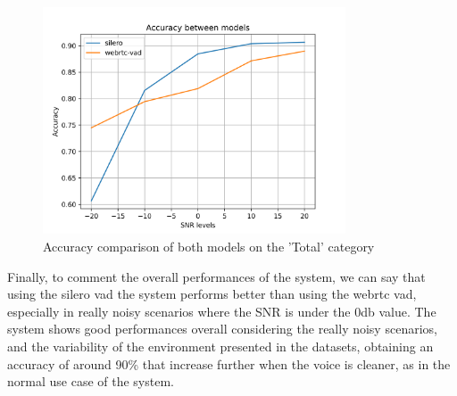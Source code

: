 \documentclass[../main.tex]{subfiles}
\begin{document}
\begin{figure}[ht]
    \centering
    \includegraphics[width=0.8\textwidth]{images/Accuracy between models.png}
    \caption{Accuracy comparison of both models on the 'Total' category}
    \label{fig:accuracy both models}
\end{figure}

Finally, to comment the overall performances of the system, we can say that using the silero vad the system performs better than using the webrtc vad, especially in really noisy scenarios where the SNR is under the 0db value. The system shows good performances overall considering the really noisy scenarios, and the variability of the environment presented in the datasets, obtaining an accuracy of around 90\% that increase further when the voice is cleaner, as in the normal use case of the system.
\end{document}
